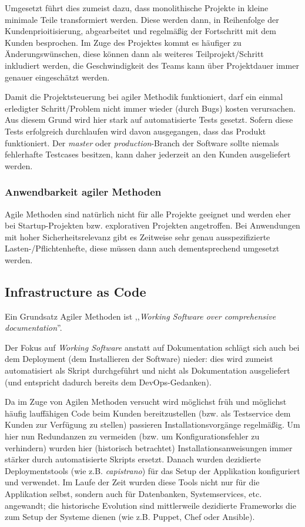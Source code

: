 Umgesetzt führt dies zumeist dazu, dass monolithische Projekte in kleine minimale Teile transformiert werden. Diese werden dann, in Reihenfolge der Kundenprioitisierung, abgearbeitet und regelmäßig der Fortschritt mit dem Kunden besprochen. Im Zuge des Projektes kommt es häufiger zu Änderungswünschen, diese können dann als weiteres Teilprojekt/Schritt inkludiert werden, die Geschwindigkeit des Teams kann über Projektdauer immer genauer eingeschätzt werden.

Damit die Projektsteuerung bei agiler Methodik funktioniert, darf ein einmal erledigter Schritt/Problem nicht immer wieder (durch Bugs) kosten verursachen. Aus diesem Grund wird hier stark auf automatisierte Tests gesetzt. Sofern diese Tests erfolgreich durchlaufen wird davon ausgegangen, dass das Produkt funktioniert. Der \textit{master} oder \textit{production}-Branch der Software sollte niemals fehlerhafte Testcases besitzen, kann daher jederzeit an den Kunden ausgeliefert werden.

\subsubsection{Anwendbarkeit agiler Methoden}

Agile Methoden sind natürlich nicht für alle Projekte geeignet und werden eher bei Startup-Projekten bzw. explorativen Projekten angetroffen. Bei Anwendungen mit hoher Sicherheitsrelevanz gibt es Zeitweise sehr genau ausspezifizierte Lasten-/Pflichtenhefte, diese müssen dann auch dementsprechend umgesetzt werden.

\subsection{Infrastructure as Code}

Ein Grundsatz Agiler Methoden ist ,,\textit{Working Software over comprehensive documentation}''.

Der Fokus auf \textit{Working Software} anstatt auf Dokumentation schlägt sich auch bei dem Deployment (dem Installieren der Software) nieder: dies wird zumeist automatisiert als Skript durchgeführt und nicht als Dokumentation ausgeliefert (und entspricht dadurch bereits dem DevOps-Gedanken).

Da im Zuge von Agilen Methoden versucht wird möglichst früh und möglichst häufig lauffähigen Code beim Kunden bereitzustellen (bzw. als Testservice dem Kunden zur Verfügung zu stellen) passieren Installationsvorgänge regelmäßig. Um hier nun Redundanzen zu vermeiden (bzw. um Konfigurationsfehler zu verhindern) wurden hier (historisch betrachtet) Installationsanweisungen immer stärker durch automatisierte Skripts ersetzt. Danach wurden dezidierte Deploymentstools (wie z.B. \textit{capistrano}) für das Setup der Applikation konfiguriert und verwendet. Im Laufe der Zeit wurden diese Tools nicht nur für die Applikation selbst, sondern auch für Datenbanken, Systemservices, etc. angewandt; die historische Evolution sind mittlerweile dezidierte Frameworks die zum Setup der Systeme dienen (wie z.B. Puppet, Chef oder Ansible).


